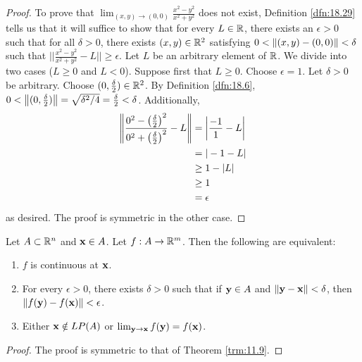 \documentclass[../main.tex]{subfiles}
\begin{document}
\begin{exercise}
\begin{enumerate}[label={(\alph*)},ref={\theexercise\alph*}]
        \begin{proof}
            To prove that $\lim_{(x,y)\to(0,0)}\frac{x^2-y^2}{x^2+y^2}$ does not exist, Definition \ref{dfn:18.29} tells us that it will suffice to show that for every $L\in\mathbb{R}$, there exists an $\epsilon>0$ such that for all $\delta>0$, there exists $(x,y)\in\mathbb{R}^2$ satisfying $0<\norm{(x,y)-(0,0)}<\delta$ such that $||\frac{x^2-y^2}{x^2+y^2}-L||\geq\epsilon$. Let $L$ be an arbitrary element of $\mathbb{R}$. We divide into two cases ($L\geq 0$ and $L<0$). Suppose first that $L\geq 0$. Choose $\epsilon=1$. Let $\delta>0$ be arbitrary. Choose $(0,\frac{\delta}{2})\in\mathbb{R}^2$. By Definition \ref{dfn:18.6}, $0<\norm{(0,\frac{\delta}{2})}=\sqrt{\delta^2/4}=\frac{\delta}{2}<\delta$. Additionally,
            \begin{align*}
                \norm{\frac{0^2-\left( \frac{\delta}{2} \right)^2}{0^2+\left( \frac{\delta}{2} \right)^2}-L} &= \left| \frac{-1}{1}-L \right|\\
                &= |-1-L|\\
                &\geq 1-|L|\\
                &\geq 1\\
                &= \epsilon
            \end{align*}
            as desired. The proof is symmetric in the other case.
        \end{proof}
    \end{enumerate}
\end{exercise}

\begin{theorem}\label{trm:18.31}
    Let $A\subset\mathbb{R}^n$ and $\mathbf{x}\in A$. Let $f:A\to\mathbb{R}^m$. Then the following are equivalent:
    \begin{enumerate}[label={\textup{(}\alph*\textup{)}}]
        \item $f$ is continuous at $\mathbf{x}$.
        \item For every $\epsilon>0$, there exists $\delta>0$ such that if $\mathbf{y}\in A$ and $\norm{\mathbf{y}-\mathbf{x}}<\delta$, then $\norm{f(\mathbf{y})-f(\mathbf{x})}<\epsilon$.
        \item Either $\mathbf{x}\notin LP(A)$ or $\lim_{\mathbf{y}\to\mathbf{x}}f(\mathbf{y})=f(\mathbf{x})$.
    \end{enumerate}
    \begin{proof}
        The proof is symmetric to that of Theorem \ref{trm:11.9}.
    \end{proof}
\end{theorem}
\end{document}

